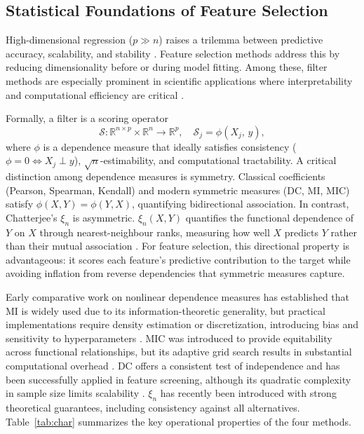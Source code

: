 \documentclass[twoside,11pt]{article}
\begin{document}
\subsection{Statistical Foundations of Feature Selection}
\label{sec:stat-foundations}
High-dimensional regression ($p \gg n$) raises a trilemma between predictive
accuracy, scalability, and stability \citep{Venkatesh2023}. Feature selection
methods address this by reducing dimensionality before or during model fitting.
Among these, filter methods are especially prominent in scientific applications
where interpretability and computational efficiency are critical
\citep{Guyon2003intro}.

Formally, a filter is a scoring operator
\[
\mathcal{S} : \mathbb{R}^{n \times p} \times \mathbb{R}^{n} \to \mathbb{R}^{p},
\quad \mathcal{S}_{j} = \phi(X_{j},\, y),
\]
where $\phi$ is a dependence measure that ideally satisfies consistency
($\phi = 0 \iff X_{j} \perp y$), $\sqrt{n}$-estimability, and computational
tractability. A critical distinction among dependence measures is symmetry.
Classical coefficients (Pearson, Spearman, Kendall) and modern symmetric
measures (DC, MI, MIC) satisfy $\phi(X, Y) = \phi(Y, X)$, quantifying
bidirectional association. In contrast, Chatterjee's $\xi_n$ is asymmetric.
$\xi_n(X, Y)$ quantifies the functional dependence of $Y$ on $X$ through
nearest-neighbour ranks, measuring how well $X$ predicts $Y$ rather than their
mutual association \citep{Chatterjee2021}. For feature selection, this
directional property is advantageous: it scores each feature's predictive
contribution to the target while avoiding inflation from reverse dependencies
that symmetric measures capture.

Early comparative work on nonlinear dependence measures has established that MI
is widely used due to its information-theoretic generality, but practical
implementations require density estimation or discretization, introducing bias
and sensitivity to hyperparameters \citep{Ross2014mutual}. MIC was introduced
to provide equitability across functional relationships, but its adaptive grid
search results in substantial computational overhead \citep{Reshef2011}. DC
offers a consistent test of independence and has been successfully applied in
feature screening, although its quadratic complexity in sample size limits
scalability \citep{Szekely2007}. $\xi_n$ \citep{Chatterjee2021} has recently
been introduced with strong theoretical guarantees, including consistency
against all alternatives. Table~\ref{tab:char} summarizes the key operational
properties of the four methods.
\end{document}
